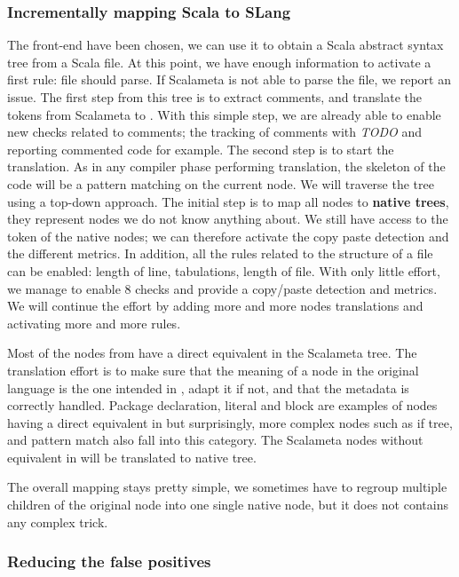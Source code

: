 \subsubsection{Incrementally mapping Scala to SLang}
\label{subsubsec:scala_to_slang}
The front-end have been chosen, we can use it to obtain a Scala abstract syntax tree from a Scala file. 
At this point, we have enough information to activate a first rule: file should parse.
If Scalameta is not able to parse the file, we report an issue.
The first step from this tree is to extract comments, and translate the tokens from Scalameta to \slang{}.
With this simple step, we are already able to enable new checks related to comments; the tracking of comments with \emph{TODO} and reporting commented code for example.
The second step is to start the translation. 
As in any compiler phase performing translation, the skeleton of the code will be a pattern matching on the current node. 
We will traverse the tree using a top-down approach.
The initial step is to map all nodes to \textbf{native trees}, they represent nodes we do not know anything about.
We still have access to the token of the native nodes; we can therefore activate the copy paste detection and the different metrics. 
In addition, all the rules related to the structure of a file can be enabled: length of line, tabulations, length of file.
With only little effort, we manage to enable 8 checks and provide a copy/paste detection and metrics. 
We will continue the effort by adding more and more nodes translations and activating more and more rules.

Most of the nodes from \slang{} have a direct equivalent in the Scalameta tree.
The translation effort is to make sure that the meaning of a node in the original language is the one intended in \slang{}, adapt it if not, and that the metadata is correctly handled.
Package declaration, literal and block are examples of nodes having a direct equivalent in \slang{} but surprisingly, more complex nodes such as if tree, and pattern match also fall into this category. 
The Scalameta nodes without equivalent in \slang{} will be translated to native tree.

The overall mapping stays pretty simple, we sometimes have to regroup
multiple children of the original node into one single native node, but it does
not contains any complex trick.

\subsubsection{Reducing the false positives}
\label{subsubsec:reducing_false_positives}

